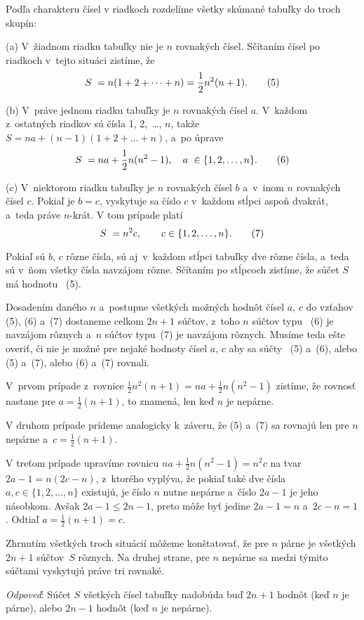 {%
 Podľa charakteru čísel v riadkoch rozdelíme všetky skúmané
 tabuľky do troch skupín:

 (a) V~žiadnom riadku tabuľky nie je $n$ rovnakých čísel. Sčítaním
 čísel po riadkoch v~tejto situáci zistíme, že
$$
 S~= n(1+2+\dots+n)=\frac12n^{2}(n+1) .  \tag5
$$

 (b) V~práve jednom riadku tabuľky je $n$ rovnakých čísel $a$.
 V~každom z~ostatných riadkov sú čísla 1, 2,~\dots, $n$, takže
$S=na+(n-1)(1+2+\dots+n)$, a~po úprave
$$
 S~= na+\frac12n(n^{2}-1),\quad a~\in \{1, 2, \dots, n\}. \tag6
$$

 (c) V~niektorom riadku tabuľky je $n$ rovnakých čísel $b$ a~v~inom
 $n$ rovnakých čísel $c$. Pokiaľ je $b=c$, vyskytuje sa číslo
 $c$ v~každom stĺpci aspoň dvakrát, a~teda práve $n$-krát.
 V tom prípade platí
$$
 S~= n^{2}c, \qquad c \in \{1, 2,\dots, n\}.        \tag7
$$

 Pokiaľ sú $b$, $c$ rôzne čísla, sú aj~v~každom stĺpci tabuľky
dve rôzne čísla, a~teda sú v~ňom všetky čísla navzájom rôzne.
Sčítaním po stĺpcoch zistíme, že súčet $S$ má hodnotu~ (5).

 Dosadením daného $n$ a~postupne všetkých možných hodnôt čísel $a$,
$c$ do vzťahov~ (5), (6) a~(7) dostaneme celkom $2n+1$ súčtov,
z~toho $n$ súčtov typu~ (6) je navzájom rôznych a~$n$ súčtov
typu~(7) je navzájom rôznych. Musíme teda ešte overiť, či
nie je možné pre nejaké hodnoty čísel $a$, $c$ aby sa súčty~ (5)
a~(6), alebo (5) a~(7), alebo (6) a~(7) rovnali.

 V~prvom prípade z~rovnice $\frac12n^{2}(n+1)=na +
\frac12n(n^{2}-1)$ zistíme, že rovnosť nastane pre $a=
\frac12(n+1)$, to znamená, len keď $n$ je nepárne.

 V druhom prípade prídeme analogicky k~záveru, že (5) a~(7) sa
rovnajú len pre $n$ nepárne a~$c=\frac12(n+1)$.

 V treťom prípade upravíme rovnicu $na+\frac12n(n^{2}-1)=
n^{2}c$ na tvar $2a-1=n(2c-n)$, z~ktorého vyplýva, že pokiaľ také
dve čísla $a, c \in \{1, 2,\dots, n\}$ existujú, je číslo $n$
nutne nepárne a~číslo $2a-1$ je jeho násobkom. Avšak $2a-1
\le 2n-1$, preto môže byť jedine $2a-1=n$ a~$2c-n=1$. Odtiaľ $a=
\frac12(n+1)=c$.

 Zhrnutím všetkých troch situácií môžeme konštatovať, že pre $n$ párne
 je všetkých $2n+1$ súčtov~$S$ rôznych. Na druhej strane,
  pre $n$ nepárne sa medzi týmito súčtami vyskytujú práve tri rovnaké.

{\it Odpoveď\/}: Súčet $S$ všetkých čísel tabuľky nadobúda buď $2n+1$
hodnôt (keď $n$ je párne), alebo $2n-1$ hodnôt (keď $n$ je
nepárne).
}

